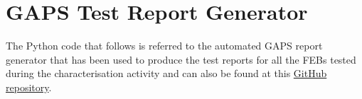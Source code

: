 \chapter{GAPS Test Report Generator} \label{appendixReportGenerator}

The Python code that follows is referred to the automated GAPS report generator that has been used to produce the test reports for all the FEBs tested during the characterisation activity and can also be found at this \href{https://github.com/lucaghislo/GAPS-FEB-report-generator}{GitHub repository}.



            

